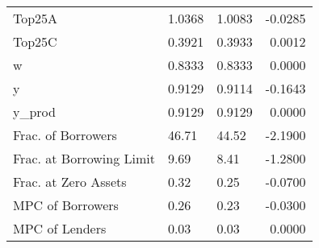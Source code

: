 \begin{table}
\begin{tabular}{lllr}
                  Top25A &  1.0368 &   1.0083 &  -0.0285 \\
                  Top25C &  0.3921 &   0.3933 &   0.0012 \\
                       w &  0.8333 &   0.8333 &   0.0000 \\
                       y &  0.9129 &   0.9114 &  -0.1643 \\
                  y\_prod &  0.9129 &   0.9129 &   0.0000 \\
      Frac. of Borrowers &   46.71 &    44.52 &  -2.1900 \\
Frac. at Borrowing Limit &    9.69 &     8.41 &  -1.2800 \\
    Frac. at Zero Assets &    0.32 &     0.25 &  -0.0700 \\
        MPC of Borrowers &    0.26 &     0.23 &  -0.0300 \\
          MPC of Lenders &    0.03 &     0.03 &   0.0000 \\
\bottomrule
\end{tabular}
\end{table}
